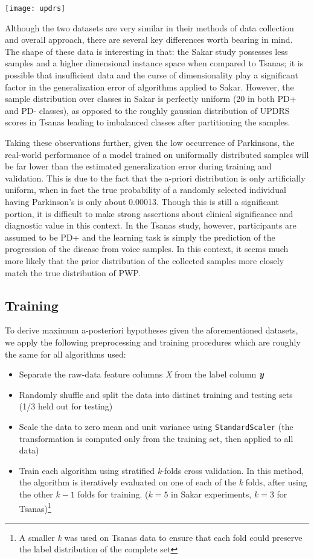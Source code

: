 \documentclass[12pt]{article}
\begin{document}
\begin{center}
\texttt{[image: updrs]}
\end{center}

Although the two datasets are very similar in their methods of data collection and overall approach, there are several key differences worth bearing in mind. The shape of these data is interesting in that: the Sakar study possesses less samples and a higher dimensional instance space when compared to Tsanas; it is possible that insufficient data and the curse of dimensionality play a significant factor in the generalization error of algorithms applied to Sakar. However, the sample distribution over classes in Sakar is perfectly uniform (20 in both PD+ and PD- classes), as opposed to the roughly gaussian distribution of UPDRS scores in Tsanas leading to imbalanced classes after partitioning the samples.

Taking these observations further, given the low occurrence of Parkinsons, the real-world performance of a model trained on uniformally distributed samples will be far lower than the estimated generalization error during training and validation. This is due to the fact that the a-priori distribution is only artificially uniform, when in fact the true probability of a randomly selected individual having Parkinson's is only about 0.00013. Though this is still a significant portion, it is difficult to make strong assertions about clinical significance and diagnostic value in this context. In the Tsanas study, however, participants are assumed to be PD+ and the learning task is simply the prediction of the progression of the disease from voice samples. In this context, it seems much more likely that the prior distribution of the collected samples more closely match the true distribution of PWP.

\subsection{Training}
To derive maximum a-posteriori hypotheses given the aforementioned datasets, we apply the following preprocessing and training procedures which are roughly the same for all algorithms used:
\begin{itemize}
  \item Separate the raw-data feature columns \textit{X} from the label column \textbf{\textit{y}}
  \item Randomly shuffle and split the data into distinct training and testing sets (1/3 held out for testing)
  \item Scale the data to zero mean and unit variance using \texttt{StandardScaler} (the transformation is computed only from the training set, then applied to all data)
  \item Train each algorithm using stratified \textit{k}-folds cross validation. In this method, the algorithm is iteratively evaluated on one of each of the \textit{k} folds, after using the other $k-1$ folds for training. ($k=5$ in Sakar experiments, $k=3$ for Tsanas)\footnote{A smaller \textit{k} was used on Tsanas data to ensure that each fold could preserve the label distribution of the complete set}
\end{itemize}
\end{document}
